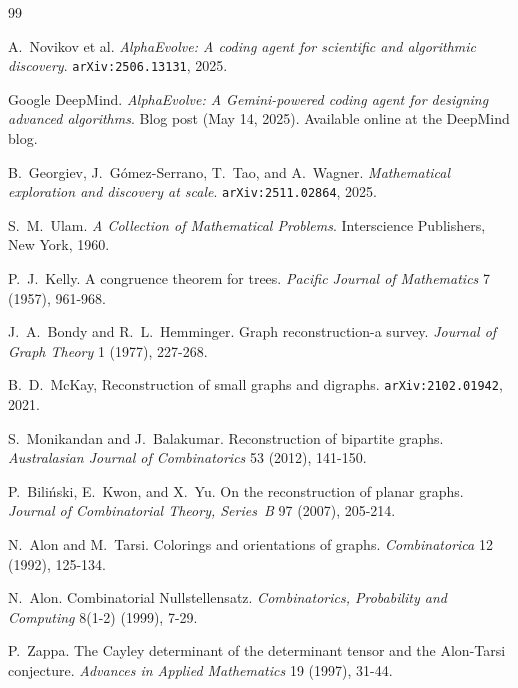 \documentclass[11pt]{amsart}
\begin{document}
\begin{thebibliography}{99}

A.~Novikov et al.
\newblock \emph{AlphaEvolve: A coding agent for scientific and algorithmic discovery}.
\newblock \texttt{arXiv:2506.13131}, 2025.

Google DeepMind.
\newblock \emph{AlphaEvolve: A Gemini-powered coding agent for designing advanced algorithms}.
\newblock Blog post (May 14, 2025). Available online at the DeepMind blog.

B.~Georgiev, J.~G{\'o}mez-Serrano, T.~Tao, and A.~Wagner.
\newblock \emph{Mathematical exploration and discovery at scale}.
\newblock \texttt{arXiv:2511.02864}, 2025.

S.~M.~Ulam.
\newblock \emph{A Collection of Mathematical Problems}.
\newblock Interscience Publishers, New York, 1960.

P.~J.~Kelly.
\newblock A congruence theorem for trees.
\newblock \emph{Pacific Journal of Mathematics} 7 (1957), 961-968.

J.~A.~Bondy and R.~L.~Hemminger.
\newblock Graph reconstruction-a survey.
\newblock \emph{Journal of Graph Theory} 1 (1977), 227-268.

B.~D.~McKay,
\newblock Reconstruction of small graphs and digraphs.
\newblock \texttt{arXiv:2102.01942}, 2021.

S.~Monikandan and J.~Balakumar.
\newblock Reconstruction of bipartite graphs.
\newblock \emph{Australasian Journal of Combinatorics} 53 (2012), 141-150.

P.~Bili{\'n}ski, E.~Kwon, and X.~Yu.
\newblock On the reconstruction of planar graphs.
\newblock \emph{Journal of Combinatorial Theory, Series~B} 97 (2007), 205-214.

N.~Alon and M.~Tarsi.
\newblock Colorings and orientations of graphs.
\newblock \emph{Combinatorica} 12 (1992), 125-134.

N.~Alon.
\newblock Combinatorial Nullstellensatz.
\newblock \emph{Combinatorics, Probability and Computing} 8(1-2) (1999), 7-29.

P.~Zappa.
\newblock The Cayley determinant of the determinant tensor and the Alon-Tarsi conjecture.
\newblock \emph{Advances in Applied Mathematics} 19 (1997), 31-44.


\end{thebibliography}
\end{document}
